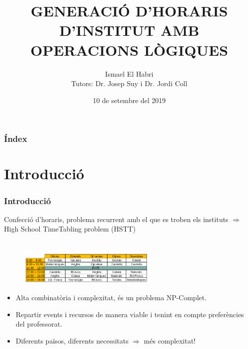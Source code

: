 \documentclass[13pt]{beamer}
\title[Generació d'horaris d'institut amb operacions lògiques]{GENERACIÓ D'HORARIS D'INSTITUT AMB OPERACIONS LÒGIQUES}
\author[Ismael El Habri]{Ismael El Habri \\ \footnotesize Tutors: Dr. Josep Suy i Dr. Jordi Coll}
\institute{Universitat de Girona}
\date[KPT 2004] %
{10 de setembre del 2019}
\begin{document}
\frame{\titlepage}
\begin{frame}
  \frametitle{Índex}
  \tableofcontents
\end{frame}

\section{Introducció}
  \begin{frame}
    \frametitle{Introducció}

    Confecció d'horaris, problema recurrent amb el que es troben els instituts $\Rightarrow$ High School TimeTabling problem (HSTT)\\ ~\\

    \begin{figure}
      \includegraphics[width=0.6\textwidth]{Diagrames/horari.png}
    \end{figure}
    
    \begin{itemize}
      \item Alta combinatòria i complexitat, és un problema NP-Complet.
      \item Repartir events i recursos de manera viable i tenint en compte preferències del professorat.
      \item Diferents països, diferents necessitats  $\Rightarrow$  més complexitat!
    \end{itemize}
    
    


  \end{frame}
\end{document}

